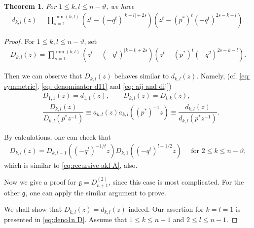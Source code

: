\documentclass[11pt, leqno]{amsart}
\newtheorem{theorem}{Theorem}[section]
\theoremstyle{definition}
\numberwithin{equation}{section}
\begin{document}
\medskip

\begin{theorem} \label{Thm: dkl}
For $1\leq k,l \le n-\vartheta$, we have
\begin{align}\label{eq: dkl}
 d_{k,l}(z) =  \prod_{s=1}^{\min(k,l)} (z^t-(-q^t)^{|k-l|+2s})(z^t-(p^*)^t(-q^t)^{2s-k-l}).
\end{align}
\end{theorem}

\begin{proof}
For $1 \le k, l \le n-\vartheta$, set
\begin{align} \label{eq: D(k,l)}
  {D_{k,l}}(z) = \prod_{s=1}^{\min(k,l)} (z^t-(-q^t)^{|k-l|+2s})(z^t-(p^*)^t{(-q^2)}^{2s-k-l}).
\end{align}

Then we can observe that ${D_{k,l}}(z)$ behaves similar to $d_{k,l}(z)$.
Namely, (cf. \eqref{eq: symmetric}, \eqref{eq: denominator d11} and \eqref{eq: aij and dij})
\begin{align}
& D_{1,1}(z)=d_{1,1}(z), \qquad  {D_{k,l}}(z)=D_{l,k}(z),  \label{eq: sym D and start}  \\
& \dfrac{{D_{k,l}}(z)}{{D_{k,l}}(p^*z^{-1})} \equiv a_{k,l}(z)a_{k,l}((p^*)^{-1}z) \equiv \dfrac{d_{k,l}(z)}{d_{k,l}(p^*z^{-1})}. \label{eq: Dd}
\end{align}

By calculations, one can check that
\begin{align} \label{eq:d_k,l d_k,l-1 with k1}
  {D_{k,l}}(z) = D_{k,l-1}((-q^t)^{-1/t}z)D_{k,1}((-q^t)^{l-1/2}z) \quad \text{ for } 2 \le k \le n-\vartheta,
\end{align}
which is similar to \eqref{eq:recursive akl A}, also.

\medskip

Now we give a proof for ${\mathfrak g}=D^{(2)}_{n+1}$, since
this case is most complicated. For the other ${\mathfrak g}$, one can apply the similar argument to prove.

\medskip

We shall show that ${D_{k,l}}(z)=d_{k,l}(z)$ indeed. Our assertion for $k=l=1$ is presented in \eqref{eq:deno1n D}.
Assume that $1 \le k \le n-1$ and $2 \le l \le n-1$.


\end{proof}
\end{document}
